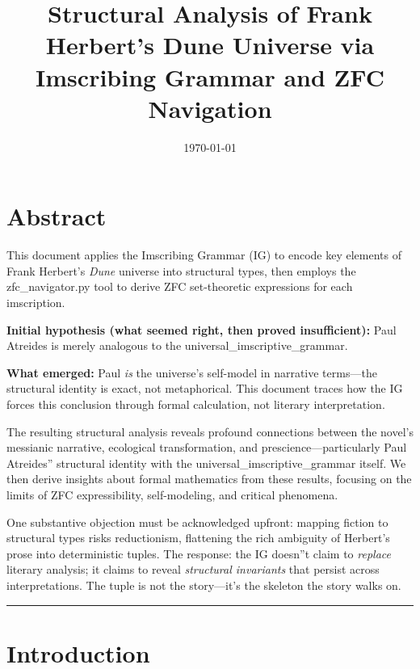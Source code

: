 \documentclass[12pt,a4paper]{article}
\begin{document}
\title{Structural Analysis of Frank Herbert's Dune Universe via Imscribing Grammar and ZFC Navigation}
\date{\today}

\maketitle

\part{Abstract}

This document applies the Imscribing Grammar (IG) to encode key elements of Frank Herbert's \emph{Dune} universe into structural types, then employs the zfc\_navigator.py tool to derive ZFC set-theoretic expressions for each imscription.

\textbf{Initial hypothesis (what seemed right, then proved insufficient):} Paul Atreides is merely analogous to the universal\_imscriptive\_grammar.

\textbf{What emerged:} Paul \emph{is} the universe's self-model in narrative terms---the structural identity is exact, not metaphorical. This document traces how the IG forces this conclusion through formal calculation, not literary interpretation.

The resulting structural analysis reveals profound connections between the novel's messianic narrative, ecological transformation, and prescience---particularly Paul Atreides'' structural identity with the universal\_imscriptive\_grammar itself. We then derive insights about formal mathematics from these results, focusing on the limits of ZFC expressibility, self-modeling, and critical phenomena.

One substantive objection must be acknowledged upfront: mapping fiction to structural types risks reductionism, flattening the rich ambiguity of Herbert's prose into deterministic tuples. The response: the IG doesn''t claim to \emph{replace} literary analysis; it claims to reveal \emph{structural invariants} that persist across interpretations. The tuple is not the story---it's the skeleton the story walks on.

\begin{center}
\rule{0.5\textwidth}{0.4pt}
\end{center}

\part{Introduction}
\end{document}

